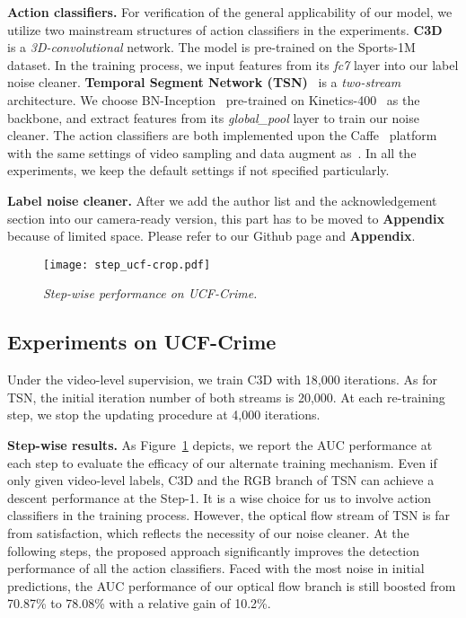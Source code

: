 \documentclass[10pt,twocolumn,letterpaper]{article}
\begin{document}
\textbf{Action classifiers.} For verification of the general applicability of our model, we utilize two mainstream structures of action classifiers in the experiments. \textbf{C3D}~\cite{tran2015learning} is a \emph{3D-convolutional} network. The model is pre-trained on the Sports-1M~\cite{karpathy2014large} dataset. In the training process, we input features from its \textit{fc7} layer into our label noise cleaner. \textbf{Temporal Segment Network (TSN)}~\cite{tsn_wang} is a \emph{two-stream} architecture. We choose BN-Inception~\cite{ioffe2015batch} pre-trained on Kinetics-400~\cite{carreira2017quo} as the backbone, and extract features from its \textit{global\_pool} layer to train our noise cleaner. The action classifiers are both implemented upon the Caffe~\cite{Jia:2014:CCA:2647868.2654889} platform with the same settings of video sampling and data augment as~\cite{tsn_wang}. In all the experiments, we keep the default settings if not specified particularly.

\textbf{Label noise cleaner.} After we add the author list and the acknowledgement section into our camera-ready version, this part has to be moved to \textbf{Appendix} because of limited space. Please refer to our Github page and \textbf{Appendix}. 


\begin{figure}[h]
\texttt{[image: step\_ucf-crop.pdf]}
\caption{\emph{Step-wise performance on {UCF-Crime}.}}
\label{fig:ucf_step}
\end{figure}

\subsection{Experiments on UCF-Crime}


Under the video-level supervision, we train C3D with 18,000 iterations. As for TSN, the initial iteration number of both streams is 20,000. At each re-training step, we stop the updating procedure at 4,000 iterations.

\textbf{Step-wise results.}
As Figure~\ref{fig:ucf_step} depicts, we report the AUC performance at each step to evaluate the efficacy of our alternate training mechanism. Even if only given video-level labels, C3D and the RGB branch of TSN can achieve a descent performance at the Step-1. It is a wise choice for us to involve action classifiers in the training process. However, the optical flow stream of TSN is far from satisfaction, which reflects the necessity of our noise cleaner. At the following steps, the proposed approach significantly improves the detection performance of all the action classifiers. Faced with the most noise in initial predictions, the AUC performance of our optical flow branch is still boosted from 70.87\% to 78.08\% with a relative gain of 10.2\%.
\end{document}

